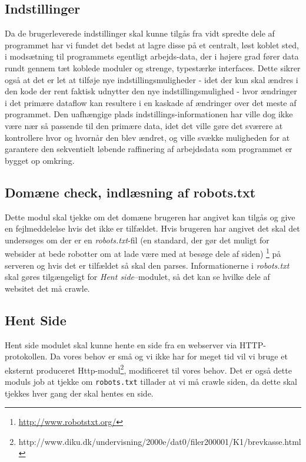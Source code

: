 \documentclass[a4paper,oneside,article, titlepage]{article}
\begin{document}
\subsection{Indstillinger}
Da de brugerleverede indstillinger skal kunne tilgås fra vidt spredte
dele af programmet har vi fundet det bedst at lagre disse på et
centralt, løst koblet sted, i modsætning til programmets egentligt
arbejds-data, der i højere grad fører data rundt gennem tæt koblede
moduler og strenge, typestærke interfaces. Dette sikrer også at det er
let at tilføje nye indstillingsmuligheder - idet der kun skal ændres i
den kode der rent faktisk udnytter den nye indstillingsmulighed - hvor
ændringer i det primære dataflow kan resultere i en kaskade af
ændringer over det meste af programmet. Den uafhængige plads
indstillings-informationen har ville dog ikke være nær så passende til
den primære data, idet det ville gøre det sværere at kontrollere hvor
og hvornår den blev ændret, og ville svække muligheden for at
garantere den sekventielt løbende raffinering af arbejdsdata som
programmet er bygget op omkring.

\subsection{Domæne check, indlæsning af robots.txt}
Dette modul skal tjekke om det domæne brugeren har angivet kan tilgås
og give en fejlmeddelelse hvis det ikke er tilfældet. Hvis brugeren
har angivet det skal det undersøges om der er en
\textit{robots.txt}-fil (en standard, der gør det muligt for websider
at bede robotter om at lade være med at besøge dele af
siden) \footnote{\url{http://www.robotstxt.org/}} på serveren og hvis
det er tilfældet så skal den parses. Informationerne i
\textit{robots.txt} skal gøres tilgængeligt for \textit{Hent
  side}--modulet, så det kan se hvilke dele af websitet det må crawle.

\subsection{Hent Side}
Hent side modulet skal kunne hente en side fra en webserver via
HTTP-protokollen. Da vores behov er små og vi ikke har for meget tid
vil vi bruge et eksternt produceret
Http-modul\footnote{http://www.diku.dk/undervisning/2000e/dat0/filer200001/K1/brevkasse.html},
modificeret til vores behov. Det er også dette moduls job at tjekke om
{\tt robots.txt} tillader at vi må crawle siden, da dette skal tjekkes
hver gang der skal hentes en side.
\end{document}

